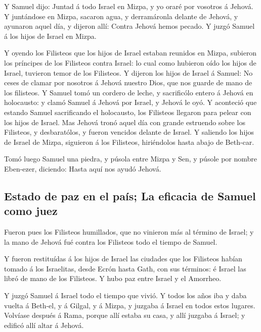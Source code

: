  Y Samuel dijo: Juntad á todo Israel en Mizpa, y yo oraré
por vosotros á Jehová.  Y juntándose en Mizpa, sacaron agua,
y derramáronla delante de Jehová, y ayunaron aquel día, y dijeron allí:
Contra Jehová hemos pecado. Y juzgó Samuel á los hijos de Israel en
Mizpa.

 Y oyendo los Filisteos que los hijos de Israel estaban
reunidos en Mizpa, subieron los príncipes de los Filisteos contra
Israel: lo cual como hubieron oído los hijos de Israel, tuvieron temor
de los Filisteos.  Y dijeron los hijos de Israel á Samuel:
No ceses de clamar por nosotros á Jehová nuestro Dios, que nos guarde de
mano de los filisteos.  Y Samuel tomó un cordero de leche, y
sacrificólo entero á Jehová en holocausto: y clamó Samuel á Jehová por
Israel, y Jehová le oyó.  Y aconteció que estando Samuel
sacrificando el holocausto, los Filisteos llegaron para pelear con los
hijos de Israel. Mas Jehová tronó aquel día con grande estruendo sobre
los Filisteos, y desbaratólos, y fueron vencidos delante de Israel.
 Y saliendo los hijos de Israel de Mizpa, siguieron á los
Filisteos, hiriéndolos hasta abajo de Beth-car.

 Tomó luego Samuel una piedra, y púsola entre Mizpa y Sen,
y púsole por nombre Eben-ezer, diciendo: Hasta aquí nos ayudó Jehová.

\hypertarget{estado-de-paz-en-el-pauxeds-la-eficacia-de-samuel-como-juez}{%
\subsection{Estado de paz en el país; La eficacia de Samuel como
juez}\label{estado-de-paz-en-el-pauxeds-la-eficacia-de-samuel-como-juez}}

 Fueron pues los Filisteos humillados, que no vinieron más
al término de Israel; y la mano de Jehová fué contra los Filisteos todo
el tiempo de Samuel.

 Y fueron restituídas á los hijos de Israel las ciudades
que los Filisteos habían tomado á los Israelitas, desde Ecrón hasta
Gath, con sus términos: é Israel las libró de mano de los Filisteos. Y
hubo paz entre Israel y el Amorrheo.

 Y juzgó Samuel á Israel todo el tiempo que vivió.
 Y todos los años iba y daba vuelta á Beth-el, y á Gilgal,
y á Mizpa, y juzgaba á Israel en todos estos lugares. 
Volvíase después á Rama, porque allí estaba su casa, y allí juzgaba á
Israel; y edificó allí altar á Jehová.

